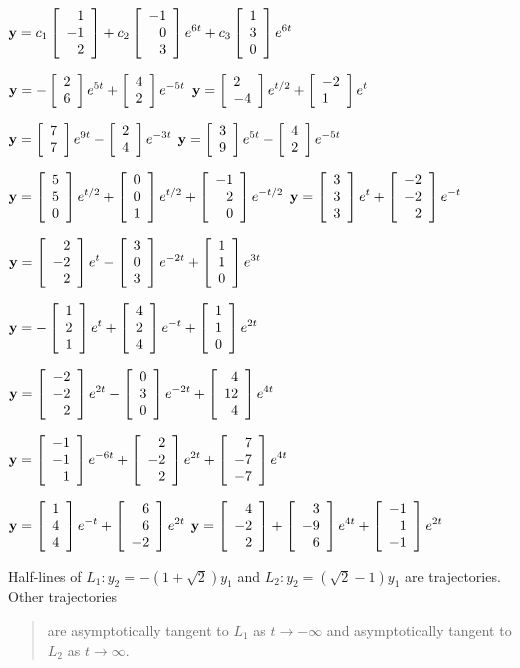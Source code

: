 \smallskip
{}
 ${\bf y}=\dst{c_{1}\left[\begin{array}{r}1\\
-1\\2
\end{array}\right]+c_{2}\left[\begin{array}{r}-1\\0\\3\end{array}
\right]e^{6t}+c_{3}\left[\begin{array}{r}1\\3\\0
\end{array}\right]e^{6t}}$

\smallskip
{}
${\bf y}=\dst{-\twocol26e^{5t}+\twocol42e^{-5t}}$
${\bf y}=\dst{\twocol2{-4}e^{t/2}+\twocol{-2}1e^{t}}$

\smallskip

${\bf y}=\dst{\twocol77e^{9t}-\twocol24e^{-3t}}$
${\bf y}=\dst{\twocol39e^{5t}-\twocol42e^{-5t}}$

\smallskip

${\bf y}=\dst{\threecol550e^{t/2}+\threecol001e^{t/2}+
\threecol{-1}20e^{-t/2}}$
\quad {}
${\bf y}=\dst{\threecol333e^{t}+\threecol{-2}{-2}2e^{-t}}$

\smallskip

${\bf y}=\dst{\threecol2{-2}2e^{t}-\threecol303e^{-2t}+\threecol110e^{3t}}$

\smallskip
{}
${\bf y}=\dst{-\threecol121e^{t}+\threecol424e^{-t}+\threecol110e^{2t}}$

\smallskip

 ${\bf y}=\dst{
\threecol{-2}{-2}2e^{2t}-\threecol030e^{-2t}+
\threecol4{12}4e^{4t}}$

\smallskip

 ${\bf y}=\dst{
\threecol{-1}{-1}1e^{-6t}+\threecol2{-2}2e^{2t}+
\threecol7{-7}{-7}e^{4t}}$
\smallskip

 ${\bf y}=\dst{
\threecol144e^{-t}+\threecol66{-2}e^{2t}}$
 ${\bf y}=\dst{
\threecol4{-2}2+\threecol3{-9}6e^{4t}+\threecol{-1}1{-1}e^{2t}}$

\medskip

\rm
{}
Half-lines of $L_{1}:y_{2}=-(1+\sqrt2)y_{1}$ and $L_{2}:y_{2}=(\sqrt2-1)y_{1}$ are trajectories.
Other trajectories
\begin{quote}are
asymptotically tangent to $L_{1}$ as $t\to-\infty$ and
asymptotically tangent to $L_{2}$ as $t\to\infty$.
\end{quote}

